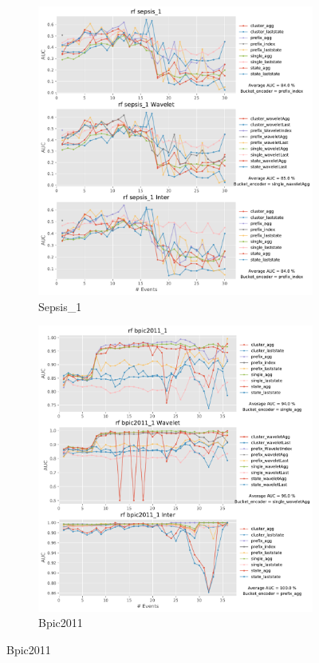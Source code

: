 \begin{figure}[!htbp] %
	
	\begin{subfigure}{0.48\textwidth}
		\includegraphics[width=\linewidth]{images/inter/rf/sepsis_1.pdf}
			
		\caption{Sepsis\_1} \label{fig:sepsisi}
	\end{subfigure}\hspace*{\fill}
	\begin{subfigure}{0.48\textwidth}
		\includegraphics[width=\linewidth]{images/inter/rf/bpic2011_1.pdf}
		\caption{Bpic2011} \label{fig:b11i}
	\end{subfigure}
	

\end{figure}
